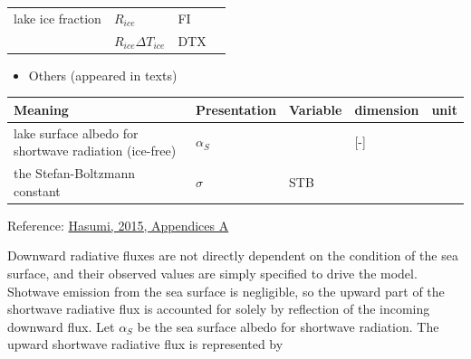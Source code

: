 \begin{longtable}[]{@{}llll@{}}
\begin{minipage}[t]{0.39\columnwidth}
lake ice fraction\strut
\end{minipage} & \begin{minipage}[t]{0.33\columnwidth}\raggedright
\(R_{ice}\)\strut
\end{minipage} & \begin{minipage}[t]{0.08\columnwidth}\raggedright
FI\strut
\end{minipage} & \begin{minipage}[t]{0.09\columnwidth}\raggedright
\strut
\end{minipage}\tabularnewline
\begin{minipage}[t]{0.39\columnwidth}\raggedright
\strut
\end{minipage} & \begin{minipage}[t]{0.33\columnwidth}\raggedright
\(R_{ice}\Delta T_{ice}\)\strut
\end{minipage} & \begin{minipage}[t]{0.08\columnwidth}\raggedright
DTX\strut
\end{minipage} & \begin{minipage}[t]{0.09\columnwidth}\raggedright
\strut
\end{minipage}\tabularnewline
\bottomrule
\end{longtable}

\begin{itemize}
\tightlist
\item
  Others (appeared in texts)
\end{itemize}

\setlength\LTleft{0pt}\setlength\LTright{0pt}\begin{longtable}[]{@{}lllll@{}}
\toprule\relax
Meaning & Presentation & Variable & dimension & unit\tabularnewline
\midrule\relax
\endhead
lake surface albedo for shortwave radiation (ice-free) & \(\alpha_S\) &
& {[}-{]} &\tabularnewline
the Stefan-Boltzmann constant & \(\sigma\) & STB & &\tabularnewline
\bottomrule
\end{longtable}

Reference:
\href{https://ccsr.aori.u-tokyo.ac.jp/~hasumi/COCO/coco4.pdf}{Hasumi,
2015, Appendices A}

Downward radiative fluxes are not directly dependent on the condition of
the sea surface, and their observed values are simply specified to drive
the model. Shotwave emission from the sea surface is negligible, so the
upward part of the shortwave radiative flux is accounted for solely by
reflection of the incoming downward flux. Let \(\alpha _S\) be the sea
surface albedo for shortwave radiation. The upward shortwave radiative
flux is represented by

